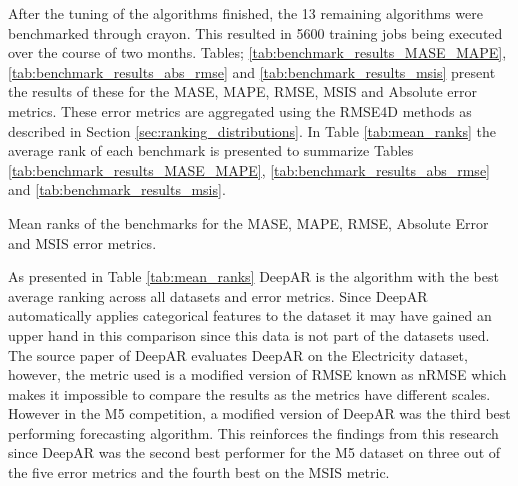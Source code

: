 After the tuning of the algorithms finished,  the 13 remaining algorithms were benchmarked through crayon. This resulted in 5600 training jobs being executed over the course of two months. Tables; \ref{tab:benchmark_results_MASE_MAPE}, \ref{tab:benchmark_results_abs_rmse} and \ref{tab:benchmark_results_msis} present the results of these for the MASE, MAPE, RMSE, MSIS and Absolute error metrics. These error metrics are aggregated using the RMSE4D methods as described in Section \ref{sec:ranking_distributions}. In Table \ref{tab:mean_ranks} the average rank of each benchmark is presented to summarize Tables \ref{tab:benchmark_results_MASE_MAPE}, \ref{tab:benchmark_results_abs_rmse} and \ref{tab:benchmark_results_msis}.

\begin{table}[h]
    \centering
    \caption{Mean ranks of the benchmarks for the MASE, MAPE, RMSE, Absolute Error and MSIS error metrics.}
    \label{tab:mean_ranks}
\end{table}

As presented in Table \ref{tab:mean_ranks} DeepAR is the algorithm with the best average ranking across all datasets and error metrics. Since DeepAR automatically applies categorical features to the dataset it may have gained an upper hand in this comparison since this data is not part of the datasets used. The source paper of DeepAR evaluates DeepAR on the Electricity dataset, however, the metric used is a modified version of RMSE known as nRMSE which makes it impossible to compare the results as the metrics have different scales. However in the M5 competition, a modified version of DeepAR was the third best performing forecasting algorithm. This reinforces the findings from this research since DeepAR was the second best performer for the M5 dataset on three out of the five error metrics and the fourth best on the MSIS metric.

